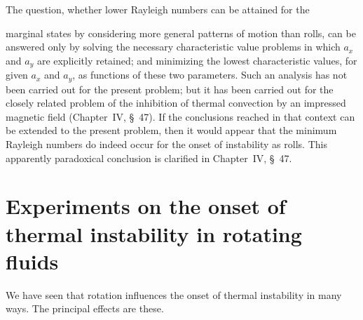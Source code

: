 The question, whether lower Rayleigh numbers can be attained for the

\noindent marginal states by considering more general patterns of motion than rolls, can be answered only by solving the necessary characteristic value problems in which $a_x$ and $a_y$ are explicitly retained; and minimizing the lowest characteristic values, for given $a_x$ and $a_y$, as functions of these two parameters. Such an analysis has not been carried out for the present problem; but it has been carried out for the closely related problem of the inhibition of thermal convection by an impressed magnetic field (Chapter~IV, \S~47). If the conclusions reached in that context can be extended to the present problem, then it would appear that the minimum Rayleigh numbers do indeed occur for the onset of instability as rolls. This apparently paradoxical conclusion is clarified in Chapter~IV, \S~47.

\section{Experiments on the onset of thermal instability in rotating fluids}\label{sec:3-35}

We have seen that rotation influences the onset of thermal instability
in many ways.  The principal effects are these.

